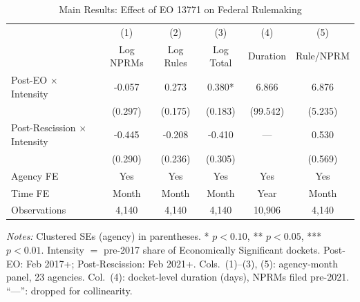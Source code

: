 \begin{table}[t]
\centering
\caption{Main Results: Effect of EO 13771 on Federal Rulemaking}
\label{tab:main}
\begin{threeparttable}\small
\begin{tabular}{lccccc}
\hline\hline
 & (1) & (2) & (3) & (4) & (5) \\
 & Log NPRMs & Log Rules & Log Total & Duration & Rule/NPRM \\
\hline
Post-EO $\times$ Intensity & -0.057 & 0.273 & 0.380* & 6.866 & 6.876 \\
 & (0.297) & (0.175) & (0.183) & (99.542) & (5.235) \\
\addlinespace
Post-Rescission $\times$ Intensity & -0.445 & -0.208 & -0.410 & --- & 0.530 \\
 & (0.290) & (0.236) & (0.305) &  & (0.569) \\
\addlinespace
\hline
Agency FE & Yes & Yes & Yes & Yes & Yes \\
Time FE & Month & Month & Month & Year & Month \\
Observations & 4,140 & 4,140 & 4,140 & 10,906 & 4,140 \\
\hline\hline
\end{tabular}
\begin{tablenotes}[flushleft]\footnotesize
\item \textit{Notes:} Clustered SEs (agency) in parentheses. * $p<0.10$, ** $p<0.05$, *** $p<0.01$. Intensity $=$ pre-2017 share of Economically Significant dockets. Post-EO: Feb 2017+; Post-Rescission: Feb 2021+. Cols.\ (1)--(3), (5): agency-month panel, 23 agencies. Col.\ (4): docket-level duration (days), NPRMs filed pre-2021. ``---'': dropped for collinearity.
\end{tablenotes}
\end{threeparttable}
\end{table}
